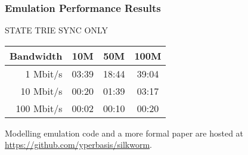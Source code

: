 \documentclass{beamer}
\begin{document}
\begin{frame}
  \frametitle{Emulation Performance Results}

  STATE TRIE SYNC ONLY
  \bigskip

    \begin{tabular}{ r | c c c }
        Bandwidth & 10M & 50M & 100M \\
        \hline
          1 Mbit/s & 03:39 & 18:44 & 39:04 \\
         10 Mbit/s & 00:20 & 01:39 & 03:17 \\
        100 Mbit/s & 00:02 & 00:10 & 00:20 \\
    \end{tabular}

    \bigskip
  Modelling emulation code and a more formal paper are hosted at
  \href{https://github.com/yperbasis/silkworm/blob/master/lab/sync_emulator.cpp}{https://github.com/yperbasis/silkworm}.


\end{frame}
\end{document}
